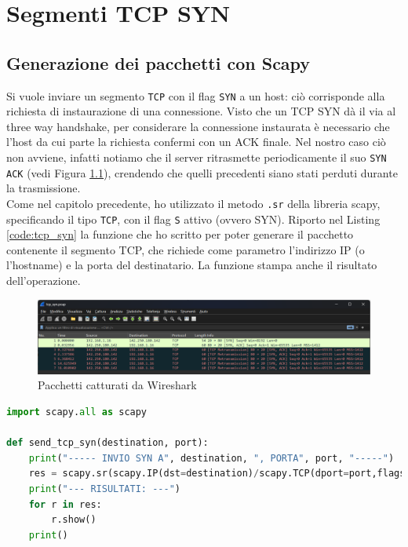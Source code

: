 \documentclass[12pt,a4paper]{report}
\begin{document}
\chapter{Segmenti TCP SYN}

\section{Generazione dei pacchetti con Scapy}
Si vuole inviare un segmento \texttt{TCP} con il flag \texttt{SYN} a un host: ciò corrisponde alla richiesta di instaurazione di una connessione. Visto che un TCP SYN dà il via al three way handshake, per considerare la connessione instaurata è necessario che l'host da cui parte la richiesta confermi con un ACK finale. Nel nostro caso ciò non avviene, infatti notiamo che il server ritrasmette periodicamente il suo \texttt{SYN ACK} (vedi Figura \ref{tcp_syn_capture}), crendendo che quelli precedenti siano stati perduti durante la trasmissione. \\
Come nel capitolo precedente, ho utilizzato il metodo \texttt{.sr} della libreria scapy, specificando il tipo \texttt{TCP}, con il flag \texttt{S} attivo (ovvero SYN). Riporto nel Listing \ref{code:tcp_syn} la funzione che ho scritto per poter generare il pacchetto contenente il segmento TCP, che richiede come parametro l'indirizzo IP (o l'hostname) e la porta del destinatario. La funzione stampa anche il risultato dell'operazione.

\begin{figure}[H]
	\centering
	\includegraphics[width=1\textwidth]{tcp_syn_capture}
 	\caption{Pacchetti catturati da Wireshark}
	\label{tcp_syn_capture}
\end{figure}

\begin{lstlisting}[language=Python, caption={Funzione python per la generazione di un segmento \texttt{TCP} con flag \texttt{SYN} attivo}, label={code:tcp_syn}]
import scapy.all as scapy

def send_tcp_syn(destination, port):
    print("----- INVIO SYN A", destination, ", PORTA", port, "-----")
    res = scapy.sr(scapy.IP(dst=destination)/scapy.TCP(dport=port,flags="S"), timeout=4)
    print("--- RISULTATI: ---")
    for r in res:
        r.show()
    print()
\end{lstlisting}
\end{document}
